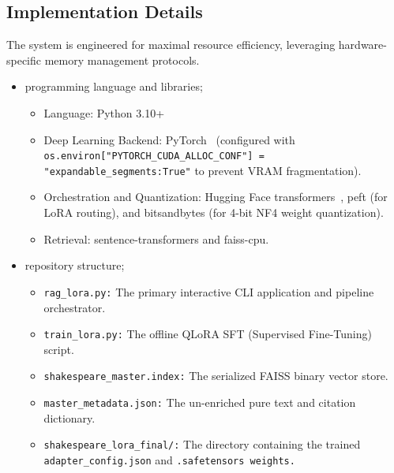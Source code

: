 \documentclass[10pt,conference]{IEEEtran}
\begin{document}
\subsection{Implementation Details}

The system is engineered for maximal resource efficiency, leveraging hardware-specific memory management protocols. 

\begin{itemize}
    \item programming language and libraries;
        \begin{itemize}
            \item Language: Python 3.10+
            \item Deep Learning Backend: 
            PyTorch~\cite{paszke2019pytorch} (configured with 
            \texttt{os.environ["PYTORCH\_CUDA\_ALLOC\_CONF"] = 
            "expandable\_segments:True"} 
            to prevent VRAM fragmentation).
            \item Orchestration and Quantization: Hugging Face transformers~\cite{wolf2020transformers}, peft (for LoRA routing), and bitsandbytes (for 4-bit NF4 weight quantization).
            \item Retrieval: sentence-transformers and faiss-cpu.
        \end{itemize}
    \item repository structure;
        \begin{itemize}
            \item \texttt{rag\_lora.py:}
            The primary interactive CLI application and pipeline orchestrator.
            \item \texttt{train\_lora.py:}
            The offline QLoRA SFT (Supervised Fine-Tuning) script.
            \item \texttt{shakespeare\_master.index:}
            The serialized FAISS binary vector store.
            \item \texttt{master\_metadata.json:}
            The un-enriched pure text and citation dictionary.
            \item \texttt{shakespeare\_lora\_final/:}
            The directory containing the trained \texttt{adapter\_config.json} and \texttt{.safetensors weights.}
        \end{itemize}
        

\end{itemize}
\end{document}
